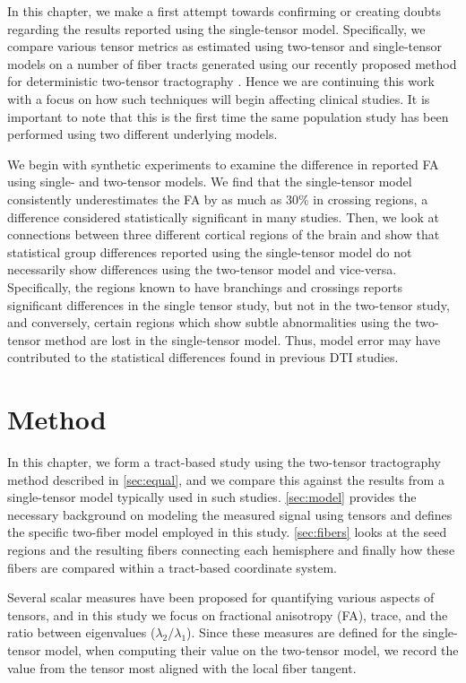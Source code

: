\documentclass[final,hyperref]{gatech-thesis}
\begin{document}
In this chapter, we make a first attempt towards confirming or creating doubts
regarding the results reported using the single-tensor model.
%
Specifically, we compare various tensor metrics as estimated using two-tensor
and single-tensor models on a number of fiber tracts generated using our
recently proposed method for deterministic two-tensor tractography
\cite{malcolm2009ipmi}.  Hence we are continuing this work with a focus
on how such techniques will begin affecting clinical studies.  It is important
to note that this is the first time the same population study has been
performed using two different underlying models.

We begin with synthetic experiments to examine the difference in reported FA
using single- and two-tensor models.  We find that the single-tensor model
consistently underestimates the FA by as much as 30\% in crossing regions, a
difference considered statistically significant in many studies.
%
Then, we look at connections between three different cortical regions of the
brain and show that statistical group differences reported using the
single-tensor model do not necessarily show differences using the two-tensor
model and vice-versa.  Specifically, the regions known to have branchings and
crossings reports significant differences in the single tensor study, but not
in the two-tensor study, and conversely, certain regions which show subtle
abnormalities using the two-tensor method are lost in the single-tensor model.
Thus, model error may have contributed to the statistical differences found in
previous DTI studies.


\section{Method} \label{sec:method}

In this chapter, we form a tract-based study using the two-tensor tractography
method described in \autoref{sec:equal}, and we compare this against the
results from a single-tensor model typically used in such studies.
%
\autoref{sec:model} provides the necessary background on modeling the measured
signal using tensors and defines the specific two-fiber model employed in this
study.
%
\autoref{sec:fibers} looks at the seed regions and the resulting fibers
connecting each hemisphere and finally how these fibers are compared within a
tract-based coordinate system.

Several scalar measures have been proposed for quantifying various aspects of
tensors, and in this study we focus on fractional anisotropy (FA), trace, and
the ratio between eigenvalues ($\lambda_2/\lambda_1$).  Since these measures
are defined for the single-tensor model, when computing their value on the
two-tensor model, we record the value from the tensor most aligned with the
local fiber tangent.
\end{document}
